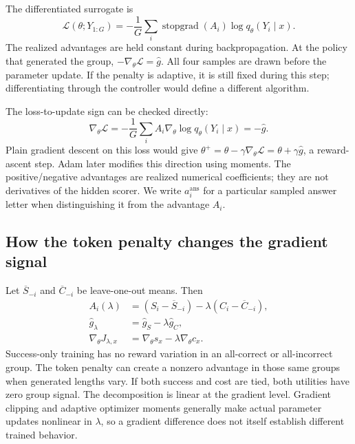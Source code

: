 \documentclass[11pt]{article}
\newcommand{\sg}{\operatorname{stopgrad}}
\begin{document}
The differentiated surrogate is
\begin{equation}
 \mathcal L(\theta;Y_{1:G})=-\frac1G\sum_i\sg(A_i)\log q_\theta(Y_i\mid x).
 \label{eq:loss}
\end{equation}
The realized advantages are held constant during backpropagation. At the policy that generated the group, $-\nabla_\theta\mathcal L=\widehat g$. All four samples are drawn before the parameter update. If the penalty is adaptive, it is still fixed during this step; differentiating through the controller would define a different algorithm.

The loss-to-update sign can be checked directly:
\begin{equation}
 \nabla_\theta\mathcal L=-\frac1G\sum_i A_i\nabla_\theta\log q_\theta(Y_i\mid x)
                         =-\widehat g.
\end{equation}
Plain gradient descent on this loss would give $\theta^+=\theta-\gamma\nabla_\theta\mathcal L=\theta+\gamma\widehat g$, a reward-ascent step. Adam later modifies this direction using moments. The positive/negative advantages are realized numerical coefficients; they are not derivatives of the hidden scorer. We write $a_i^{\mathrm{ans}}$ for a particular sampled answer letter when distinguishing it from the advantage $A_i$.

\subsection{How the token penalty changes the gradient signal}

Let $\overline S_{-i}$ and $\overline C_{-i}$ be leave-one-out means. Then
\begin{align}
 A_i(\lambda)&=(S_i-\overline S_{-i})-\lambda(C_i-\overline C_{-i}),\\
 \widehat g_\lambda&=\widehat g_S-\lambda\widehat g_C,\\
 \nabla_\theta J_{\lambda,x}&=\nabla_\theta s_x-\lambda\nabla_\theta c_x.
 \label{eq:gradientdecomposition}
\end{align}
Success-only training has no reward variation in an all-correct or all-incorrect group. The token penalty can create a nonzero advantage in those same groups when generated lengths vary. If both success and cost are tied, both utilities have zero group signal. The decomposition is linear at the gradient level. Gradient clipping and adaptive optimizer moments generally make actual parameter updates nonlinear in $\lambda$, so a gradient difference does not itself establish different trained behavior.
\end{document}
